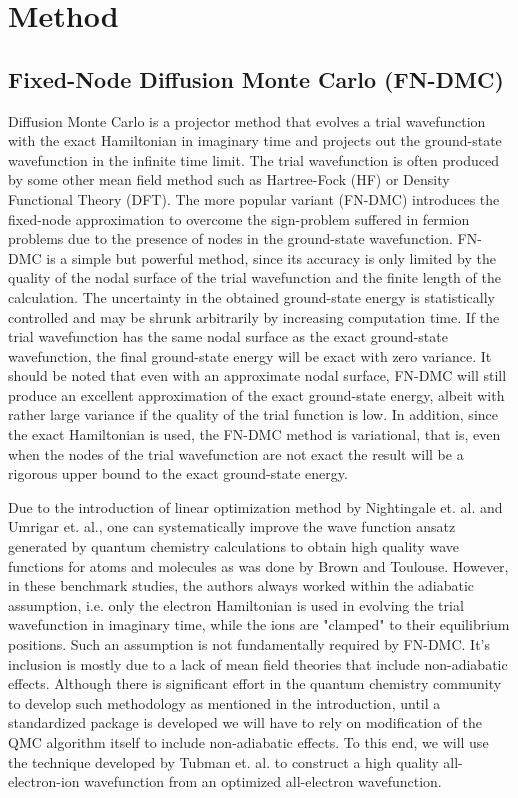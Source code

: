 \documentclass[aps,prl,superscriptaddress,groupedaddress]{revtex4}
\begin{document}
\section{Method}

\subsection{Fixed-Node Diffusion Monte Carlo (FN-DMC)}
Diffusion Monte Carlo is a projector method that evolves a trial wavefunction with the exact Hamiltonian in imaginary time and projects out the ground-state wavefunction in the infinite time limit. The trial wavefunction is often produced by some other mean field method such as Hartree-Fock (HF) or Density Functional Theory (DFT). The more popular variant (FN-DMC) introduces the fixed-node approximation to overcome the sign-problem suffered in fermion problems due to the presence of nodes in the ground-state wavefunction. FN-DMC is a simple but powerful method, since its accuracy is only limited by the quality of the nodal surface of the trial wavefunction and the finite length of the calculation. The uncertainty in the obtained ground-state energy is statistically controlled and may be shrunk arbitrarily by increasing computation time. If the trial wavefunction has the same nodal surface as the exact ground-state wavefunction, the final ground-state energy will be exact with zero variance. It should be noted that even with an approximate nodal surface, FN-DMC will still produce an excellent approximation of the exact ground-state energy, albeit with rather large variance if the quality of the trial function is low. In addition, since the exact Hamiltonian is used, the FN-DMC method is variational, that is, even when the nodes of the trial wavefunction are not exact the result will be a rigorous upper bound to the exact ground-state energy.

Due to the introduction of linear optimization method by Nightingale et. al.\cite{Nightingale_Linear} and Umrigar et. al.\cite{Umrigar_Linear}, one can systematically improve the wave function ansatz generated by quantum chemistry calculations to obtain high quality wave functions for atoms and molecules as was done by Brown\cite{Brown_Bench} and Toulouse\cite{Toulouse_Bench}. However, in these benchmark studies, the authors always worked within the adiabatic assumption, i.e. only the electron Hamiltonian is used in evolving the trial wavefunction in imaginary time, while the ions are "clamped" to their equilibrium positions. Such an assumption is not fundamentally required by FN-DMC. It's inclusion is mostly due to a lack of mean field theories that include non-adiabatic effects. Although there is significant effort in the quantum chemistry community to develop such methodology as mentioned in the introduction, until a standardized package is developed we will have to rely on modification of the QMC algorithm itself to include non-adiabatic effects. To this end, we will use the technique developed by Tubman et. al. \cite{Tubman_ECG} to construct a high quality all-electron-ion wavefunction from an optimized all-electron wavefunction.
\end{document}
